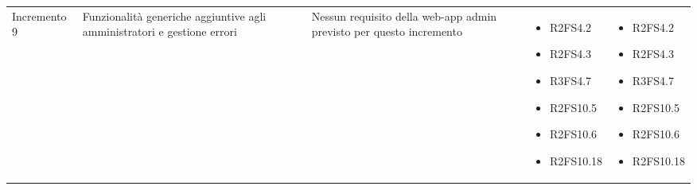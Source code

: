 {\begin{longtable}{C{2.5cm} C{3.2cm} C{2.8cm} C{2.8cm} C{2.8cm}}
Incremento 9 & Funzionalità generiche aggiuntive agli amministratori e gestione errori & 
    Nessun requisito della web-app admin previsto per questo incremento
     & \begin{itemize} 
    \item[ ] R2FS4.2
    \item[ ] R2FS4.3
    \item[ ] R3FS4.7
    \item[ ] R2FS10.5
    \item[ ] R2FS10.6
    \item[ ] R2FS10.18
\end{itemize} & \begin{itemize} 
    \item[ ] R2FS4.2
    \item[ ] R2FS4.3
    \item[ ] R3FS4.7
    \item[ ] R2FS10.5
    \item[ ] R2FS10.6
    \item[ ] R2FS10.18
\end{itemize} \\

\end{longtable}
}